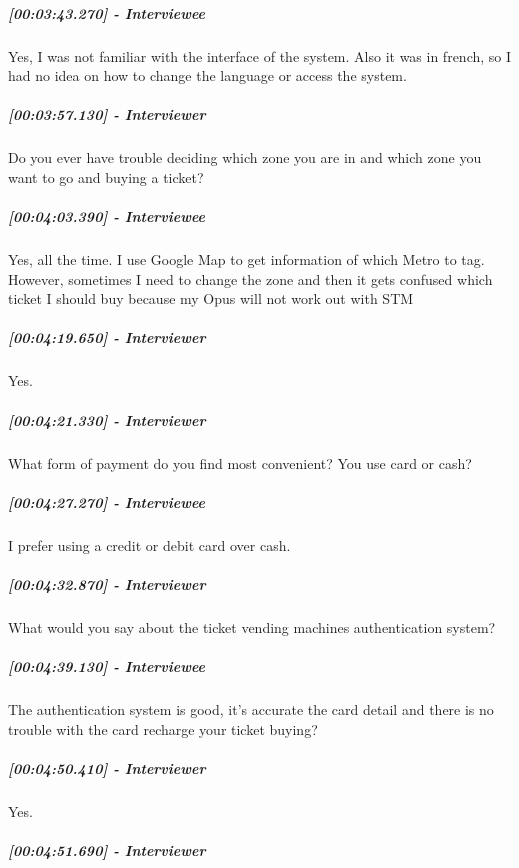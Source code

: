 \documentclass[a4paper,12pt]{article}
\begin{document}
\hypertarget{interviewee-14}{%
\subparagraph{{[}00:03:43.270{]} - Interviewee}\label{interviewee-14}}

Yes, I was not familiar with the interface of the system. Also it was in
french, so I had no idea on how to change the language or access the
system.

\hypertarget{interviewer-18}{%
\subparagraph{{[}00:03:57.130{]} - Interviewer}\label{interviewer-18}}

Do you ever have trouble deciding which zone you are in and which zone
you want to go and buying a ticket?

\hypertarget{interviewee-15}{%
\subparagraph{{[}00:04:03.390{]} - Interviewee}\label{interviewee-15}}

Yes, all the time. I use Google Map to get information of which Metro to
tag. However, sometimes I need to change the zone and then it gets
confused which ticket I should buy because my Opus will not work out
with STM

\hypertarget{interviewer-19}{%
\subparagraph{{[}00:04:19.650{]} - Interviewer}\label{interviewer-19}}

Yes.

\hypertarget{interviewer-20}{%
\subparagraph{{[}00:04:21.330{]} - Interviewer}\label{interviewer-20}}

What form of payment do you find most convenient? You use card or cash?

\hypertarget{interviewee-16}{%
\subparagraph{{[}00:04:27.270{]} - Interviewee}\label{interviewee-16}}

I prefer using a credit or debit card over cash.

\hypertarget{interviewer-21}{%
\subparagraph{{[}00:04:32.870{]} - Interviewer}\label{interviewer-21}}

What would you say about the ticket vending machines authentication
system?

\hypertarget{interviewee-17}{%
\subparagraph{{[}00:04:39.130{]} - Interviewee}\label{interviewee-17}}

The authentication system is good, it's accurate the card detail and
there is no trouble with the card recharge your ticket buying?

\hypertarget{interviewer-22}{%
\subparagraph{{[}00:04:50.410{]} - Interviewer}\label{interviewer-22}}

Yes.

\hypertarget{interviewer-23}{%
\subparagraph{{[}00:04:51.690{]} - Interviewer}\label{interviewer-23}}
\end{document}
